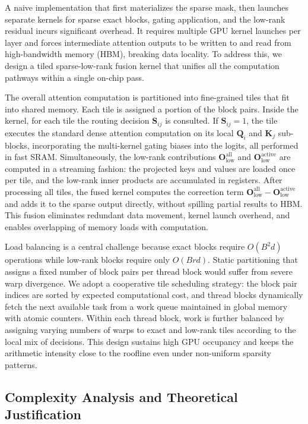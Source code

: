 \documentclass{article}
\begin{document}
A naive implementation that first materializes the sparse mask, then launches separate kernels for sparse exact blocks, gating application, and the low-rank residual incurs significant overhead. It requires multiple GPU kernel launches per layer and forces intermediate attention outputs to be written to and read from high-bandwidth memory (HBM), breaking data locality. To address this, we design a tiled sparse-low-rank fusion kernel that unifies all the computation pathways within a single on-chip pass.

The overall attention computation is partitioned into fine-grained tiles that fit into shared memory. Each tile is assigned a portion of the block pairs. Inside the kernel, for each tile the routing decision $\mathbf{S}_{ij}$ is consulted. If $\mathbf{S}_{ij}=1$, the tile executes the standard dense attention computation on its local $\mathbf{Q}_i$ and $\mathbf{K}_j$ sub-blocks, incorporating the multi-kernel gating biases into the logits, all performed in fast SRAM. Simultaneously, the low-rank contributions $\mathbf{O}_{\text{low}}^{\text{all}}$ and $\mathbf{O}_{\text{low}}^{\text{active}}$ are computed in a streaming fashion: the projected keys and values are loaded once per tile, and the low-rank inner products are accumulated in registers. After processing all tiles, the fused kernel computes the correction term $\mathbf{O}_{\text{low}}^{\text{all}} - \mathbf{O}_{\text{low}}^{\text{active}}$ and adds it to the sparse output directly, without spilling partial results to HBM. This fusion eliminates redundant data movement, kernel launch overhead, and enables overlapping of memory loads with computation.

Load balancing is a central challenge because exact blocks require $O(B^2 d)$ operations while low-rank blocks require only $O(B r d)$. Static partitioning that assigns a fixed number of block pairs per thread block would suffer from severe warp divergence. We adopt a cooperative tile scheduling strategy: the block pair indices are sorted by expected computational cost, and thread blocks dynamically fetch the next available task from a work queue maintained in global memory with atomic counters. Within each thread block, work is further balanced by assigning varying numbers of warps to exact and low-rank tiles according to the local mix of decisions. This design sustains high GPU occupancy and keeps the arithmetic intensity close to the roofline even under non-uniform sparsity patterns.

\subsection{Complexity Analysis and Theoretical Justification}
\end{document}
